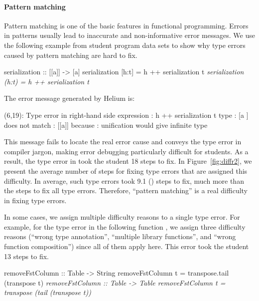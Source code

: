 \documentclass[12pt]{report}	%
\begin{document}
\paragraph{Pattern matching}
%
Pattern matching is one of the basic features in
functional programming. Errors in patterns usually
lead to inaccurate and non-informative error 
messages. 
We use the following example
from student program data sets
to show why type errors caused by pattern matching
are hard to fix.
%
\begin{program}
serialization :: [[a]] -> [a]
serialization [h:t] = h ++ serialization t
\it{serialization (h:t) = h ++ serialization t}
\end{program}
%
The error message generated by Helium is:
%
\begin{program}
(6,19): Type error in right-hand side
 expression       : h ++ serialization t
   type           : [a  ]
   does not match : [[a]]
 because          : unification would give infinite type
\end{program}
%
This message fails to locate the real error cause and
conveys the type error in compiler jargon, making
error debugging particularly difficult for students. 
As a result, the type 
error in  took the student 18 steps to fix. 
%
In Figure~\ref{fig:diffr2}, we present the average number
of steps for fixing type errors that are assigned this difficulty. 
In average, such type errors took 
9.1 () steps to fix, much more than the steps to fix all type errors.
Therefore, ``pattern matching'' is a
real difficulty in fixing type errors. 

In some cases, we assign multiple difficulty reasons
to a single type error. 
For example, for the type error in the following
function , 
we assign three difficulty reasons (``wrong type
annotation'', ``multiple library functions'',
and ``wrong function composition'') since all of them apply
here. This error took the student 13 steps to fix.
%
%
\begin{program}
removeFstColumn :: Table -> String
removeFstColumn t = transpose.tail (transpose t)
\it{removeFstColumn :: Table -> Table}
\it{removeFstColumn t = transpose (tail (transpose t))}
\end{program}
%
\end{document}
